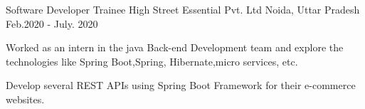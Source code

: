 \begin{cventries}
  \cventry
    {Software Developer Trainee} %
    {High Street Essential Pvt. Ltd} %
    {Noida, Uttar Pradesh} %
    {Feb.2020 - July. 2020} %
    {
      \begin{cvitems} %
        \item {Worked as an intern in the java Back-end Development team and explore the technologies like Spring Boot,Spring, Hibernate,micro services, etc.} 
        \item {Develop several REST APIs using Spring Boot Framework for their e-commerce websites.} 
      \end{cvitems}
    }

  
\end{cventries}
